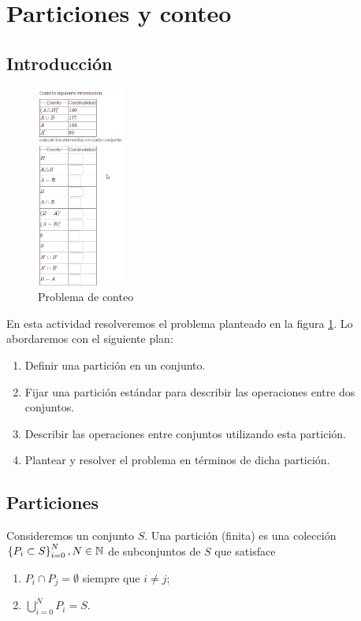 \section{Particiones y conteo}

\subsection{Introducción}
\begin{figure}
	\centering
	\includegraphics[height=250px]{./em/2020-08-15 19_49_02}
	\caption{Problema de conteo}
	\label{fig:problema-conteo}
\end{figure}

En esta actividad resolveremos el problema planteado en la figura \ref{fig:problema-conteo}. Lo abordaremos con el siguiente plan:
\begin{enumerate}
	\item Definir una partición en un conjunto.
	\item Fijar una partición estándar para describir las operaciones entre dos conjuntos. 
	\item Describir las operaciones entre conjuntos utilizando esta partición.
	\item Plantear y resolver el problema en términos de dicha partición. 
\end{enumerate}


\subsection{Particiones}

Consideremos un conjunto $ S $. Una partición (finita) es una colección $ \left\{ P_i \subset S \right\}_{i=0}^{N}, N \in \mathbb{N} $ de subconjuntos de $ S $ que satisface
\begin{enumerate}
	\item $ P_i \cap P_j =\emptyset $ siempre que $ i\neq j $;
	\item $ \bigcup_{i=0}^{N} P_i = S $. 
\end{enumerate}

